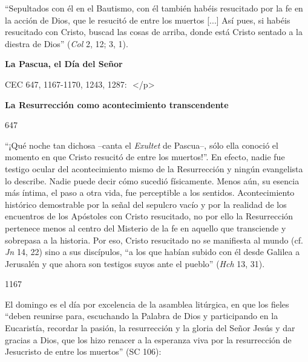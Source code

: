 			\begin{ccecite}“Sepultados con él en el Bautismo, con él también habéis resucitado por la fe en la acción de Dios, que le resucitó de entre los muertos [...] Así pues, si habéis resucitado con Cristo, buscad las cosas de arriba, donde está Cristo sentado a la diestra de Dios” (\textit{Col} 2, 12; 3, 1).\end{ccecite}
			
			\begin{ccetheme}\textbf{La Pascua, el Día del Señor }\end{ccetheme}
			
			\begin{ccereference}\end{ccereference}CEC 647, 1167-1170, 1243, 1287:  </p>
			
			\begin{ccebody}\textbf{La Resurrección como acontecimiento transcendente}\end{ccebody}
			
			\begin{ccebody}\begin{ccenumber}647\end{ccenumber} “¡Qué noche tan dichosa –canta el \textit{Exultet} de Pascua–, sólo ella conoció el momento en que Cristo resucitó de entre los muertos!”. En efecto, nadie fue testigo ocular del acontecimiento mismo de la Resurrección y ningún evangelista lo describe. Nadie puede decir cómo sucedió físicamente. Menos aún, su esencia más íntima, el paso a otra vida, fue perceptible a los sentidos. Acontecimiento histórico demostrable por la señal del sepulcro vacío y por la realidad de los encuentros de los Apóstoles con Cristo resucitado, no por ello la Resurrección pertenece menos al centro del Misterio de la fe en aquello que transciende y sobrepasa a la historia. Por eso, Cristo resucitado no se manifiesta al mundo (cf. \textit{Jn} 14, 22) sino a sus discípulos, “a los que habían subido con él desde Galilea a Jerusalén y que ahora son testigos suyos ante el pueblo” (\textit{Hch} 13, 31).\end{ccebody}
			
			\begin{ccebody}\begin{ccenumber}1167\end{ccenumber} El domingo es el día por excelencia de la asamblea litúrgica, en que los fieles “deben reunirse para, escuchando la Palabra de Dios y participando en la Eucaristía, recordar la pasión, la resurrección y la gloria del Señor Jesús y dar gracias a Dios, que los hizo renacer a la esperanza viva por la resurrección de Jesucristo de entre los muertos” (SC 106):\end{ccebody}
			

